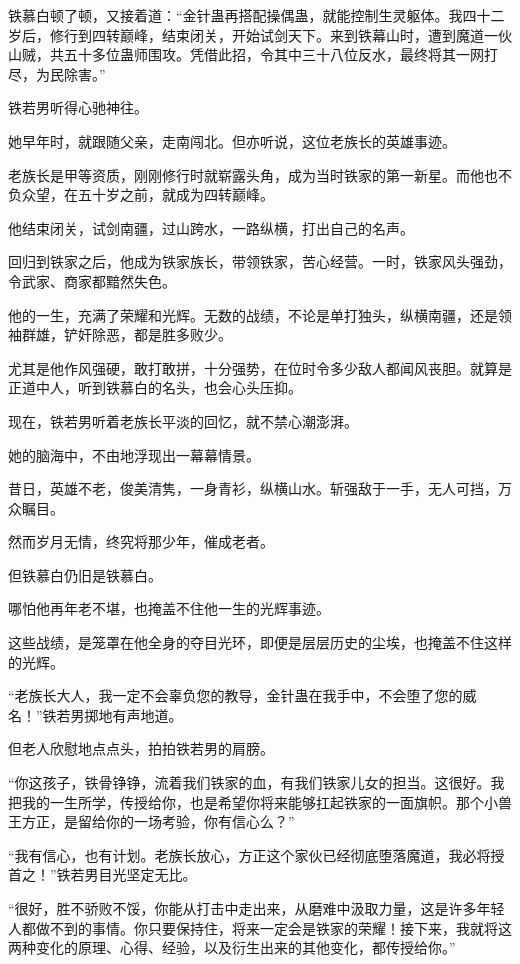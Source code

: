 \begin{this_body}
铁慕白顿了顿，又接着道：“金针蛊再搭配操偶蛊，就能控制生灵躯体。我四十二岁后，修行到四转巅峰，结束闭关，开始试剑天下。来到铁幕山时，遭到魔道一伙山贼，共五十多位蛊师围攻。凭借此招，令其中三十八位反水，最终将其一网打尽，为民除害。”

铁若男听得心驰神往。

她早年时，就跟随父亲，走南闯北。但亦听说，这位老族长的英雄事迹。

老族长是甲等资质，刚刚修行时就崭露头角，成为当时铁家的第一新星。而他也不负众望，在五十岁之前，就成为四转巅峰。

他结束闭关，试剑南疆，过山跨水，一路纵横，打出自己的名声。

回归到铁家之后，他成为铁家族长，带领铁家，苦心经营。一时，铁家风头强劲，令武家、商家都黯然失色。

他的一生，充满了荣耀和光辉。无数的战绩，不论是单打独头，纵横南疆，还是领袖群雄，铲奸除恶，都是胜多败少。

尤其是他作风强硬，敢打敢拼，十分强势，在位时令多少敌人都闻风丧胆。就算是正道中人，听到铁慕白的名头，也会心头压抑。

现在，铁若男听着老族长平淡的回忆，就不禁心潮澎湃。

她的脑海中，不由地浮现出一幕幕情景。

昔日，英雄不老，俊美清隽，一身青衫，纵横山水。斩强敌于一手，无人可挡，万众瞩目。

然而岁月无情，终究将那少年，催成老者。

但铁慕白仍旧是铁慕白。

哪怕他再年老不堪，也掩盖不住他一生的光辉事迹。

这些战绩，是笼罩在他全身的夺目光环，即便是层层历史的尘埃，也掩盖不住这样的光辉。

“老族长大人，我一定不会辜负您的教导，金针蛊在我手中，不会堕了您的威名！”铁若男掷地有声地道。

但老人欣慰地点点头，拍拍铁若男的肩膀。

“你这孩子，铁骨铮铮，流着我们铁家的血，有我们铁家儿女的担当。这很好。我把我的一生所学，传授给你，也是希望你将来能够扛起铁家的一面旗帜。那个小兽王方正，是留给你的一场考验，你有信心么？”

“我有信心，也有计划。老族长放心，方正这个家伙已经彻底堕落魔道，我必将授首之！”铁若男目光坚定无比。

“很好，胜不骄败不馁，你能从打击中走出来，从磨难中汲取力量，这是许多年轻人都做不到的事情。你只要保持住，将来一定会是铁家的荣耀！接下来，我就将这两种变化的原理、心得、经验，以及衍生出来的其他变化，都传授给你。”


\end{this_body}
